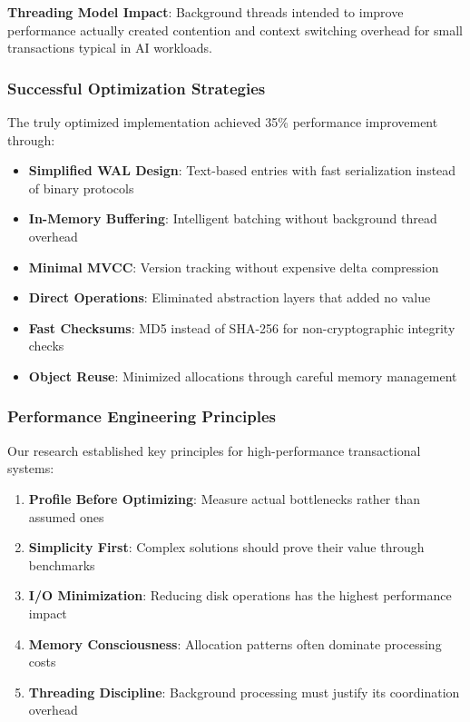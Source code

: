 \documentclass[conference]{IEEEtran}
\begin{document}
\begin{itemize}[leftmargin=*]
\textbf{Threading Model Impact}:
Background threads intended to improve performance actually created contention and context switching overhead for small transactions typical in AI workloads.

\subsubsection{Successful Optimization Strategies}

The truly optimized implementation achieved 35\% performance improvement through:

\begin{itemize}[leftmargin=*]
\item \textbf{Simplified WAL Design}: Text-based entries with fast serialization instead of binary protocols
\item \textbf{In-Memory Buffering}: Intelligent batching without background thread overhead
\item \textbf{Minimal MVCC}: Version tracking without expensive delta compression
\item \textbf{Direct Operations}: Eliminated abstraction layers that added no value
\item \textbf{Fast Checksums}: MD5 instead of SHA-256 for non-cryptographic integrity checks
\item \textbf{Object Reuse}: Minimized allocations through careful memory management
\end{itemize}

\subsubsection{Performance Engineering Principles}

Our research established key principles for high-performance transactional systems:

\begin{enumerate}[leftmargin=*]
\item \textbf{Profile Before Optimizing}: Measure actual bottlenecks rather than assumed ones
\item \textbf{Simplicity First}: Complex solutions should prove their value through benchmarks
\item \textbf{I/O Minimization}: Reducing disk operations has the highest performance impact
\item \textbf{Memory Consciousness}: Allocation patterns often dominate processing costs
\item \textbf{Threading Discipline}: Background processing must justify its coordination overhead
\end{enumerate}


\end{itemize}
\end{document}
